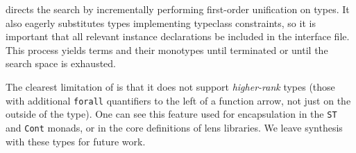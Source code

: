 \Rulecheck directs the search by incrementally performing first-order unification on types. It also eagerly substitutes types implementing typeclass constraints, so it is important that all relevant instance declarations be included in the interface file. This process yields terms and their monotypes until terminated or until the search space is exhausted.

The clearest limitation of \Rulecheck is that it does not support \textit{higher-rank} types (those with additional \texttt{forall} quantifiers to the left of a function arrow, not just on the outside of the type). One can see this feature used for encapsulation in the \texttt{ST} and \texttt{Cont} monads, or in the core definitions of lens libraries. We leave synthesis with these types for future work.
